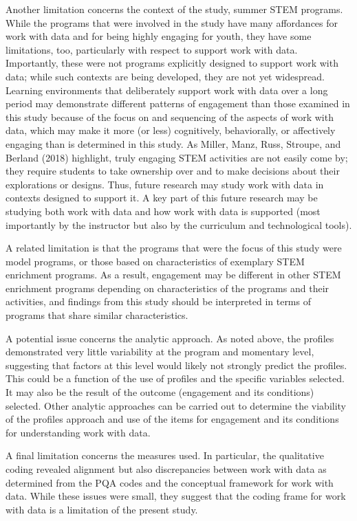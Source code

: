 \documentclass[]{book}
\theoremstyle{definition}
\theoremstyle{definition}
\theoremstyle{definition}
\theoremstyle{remark}
\begin{document}
Another limitation concerns the context of the study, summer STEM
programs. While the programs that were involved in the study have many
affordances for work with data and for being highly engaging for youth,
they have some limitations, too, particularly with respect to support
work with data. Importantly, these were not programs explicitly designed
to support work with data; while such contexts are being developed, they
are not yet widespread. Learning environments that deliberately support
work with data over a long period may demonstrate different patterns of
engagement than those examined in this study because of the focus on and
sequencing of the aspects of work with data, which may make it more (or
less) cognitively, behaviorally, or affectively engaging than is
determined in this study. As Miller, Manz, Russ, Stroupe, and Berland
(2018) highlight, truly engaging STEM activities are not easily come by;
they require students to take ownership over and to make decisions about
their explorations or designs. Thus, future research may study work with
data in contexts designed to support it. A key part of this future
research may be studying both work with data and how work with data is
supported (most importantly by the instructor but also by the curriculum
and technological tools).

A related limitation is that the programs that were the focus of this
study were model programs, or those based on characteristics of
exemplary STEM enrichment programs. As a result, engagement may be
different in other STEM enrichment programs depending on characteristics
of the programs and their activities, and findings from this study
should be interpreted in terms of programs that share similar
characteristics.

A potential issue concerns the analytic approach. As noted above, the
profiles demonstrated very little variability at the program and
momentary level, suggesting that factors at this level would likely not
strongly predict the profiles. This could be a function of the use of
profiles and the specific variables selected. It may also be the result
of the outcome (engagement and its conditions) selected. Other analytic
approaches can be carried out to determine the viability of the profiles
approach and use of the items for engagement and its conditions for
understanding work with data.

A final limitation concerns the measures used. In particular, the
qualitative coding revealed alignment but also discrepancies between
work with data as determined from the PQA codes and the conceptual
framework for work with data. While these issues were small, they
suggest that the coding frame for work with data is a limitation of the
present study.
\end{document}
